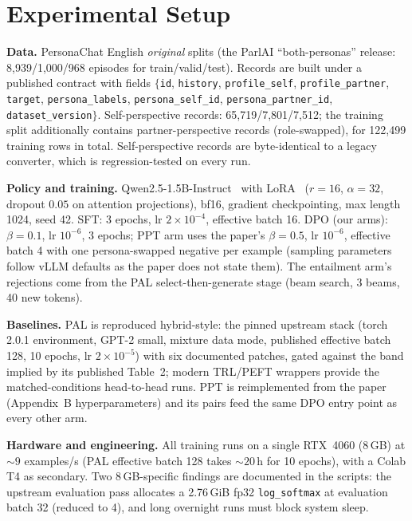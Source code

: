 \documentclass[lettersize,journal]{IEEEtran}
\begin{document}
\section{Experimental Setup}
\label{sec:setup}
\textbf{Data.} PersonaChat English \emph{original} splits (the ParlAI
``both-personas'' release: 8,939/1,000/968 episodes for train/valid/test).
Records are built under a published contract with fields $\{$\texttt{id},
\texttt{history}, \texttt{profile\_self}, \texttt{profile\_partner},
\texttt{target}, \texttt{persona\_labels}, \texttt{persona\_self\_id},
\texttt{persona\_partner\_id}, \texttt{dataset\_version}$\}$. Self-perspective
records: 65,719/7,801/7,512; the training split additionally contains
partner-perspective records (role-swapped), for 122,499 training rows in total.
Self-perspective records are byte-identical to a legacy converter, which is
regression-tested on every run.

\textbf{Policy and training.} Qwen2.5-1.5B-Instruct~\cite{qwen25} with
LoRA~\cite{hu2022lora} ($r=16$,
$\alpha=32$, dropout $0.05$ on attention projections), bf16, gradient
checkpointing, max length 1024, seed 42. SFT: 3 epochs, lr $2\times10^{-4}$,
effective batch 16. DPO (our arms): $\beta=0.1$, lr $10^{-6}$, 3 epochs;
PPT arm uses the paper's $\beta=0.5$, lr $10^{-6}$, effective batch 4 with one
persona-swapped negative per example (sampling parameters follow vLLM defaults
as the paper does not state them). The entailment arm's rejections come from
the PAL select-then-generate stage (beam search, 3 beams, 40 new tokens).

\textbf{Baselines.} PAL is reproduced hybrid-style: the pinned upstream stack
(torch 2.0.1 environment, GPT-2 small, mixture data mode, published effective
batch 128, 10 epochs, lr $2\times10^{-5}$) with six documented patches, gated
against the band implied by its published Table~2; modern TRL/PEFT wrappers
provide the matched-conditions head-to-head runs. PPT is reimplemented from
the paper (Appendix~B hyperparameters) and its pairs feed the same DPO entry
point as every other arm.

\textbf{Hardware and engineering.} All training runs on a single RTX~4060
(8\,GB) at ${\sim}9$ examples/s (PAL effective batch 128 takes ${\sim}20$\,h for
10 epochs), with a Colab T4 as secondary. Two 8\,GB-specific findings are
documented in the scripts: the upstream evaluation pass allocates a 2.76\,GiB
fp32 \texttt{log\_softmax} at evaluation batch 32 (reduced to 4), and long
overnight runs must block system sleep.
\end{document}
